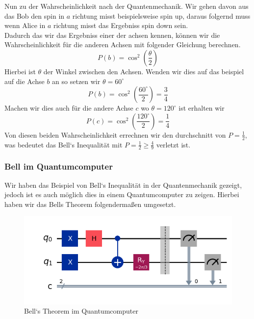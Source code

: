 Nun zu der Wahrscheinlichkeit nach der Quantenmechanik. Wir gehen davon aus das Bob den spin in $a$ richtung misst beispielsweise spin up, daraus folgernd muss wenn Alice in $a$ richtung misst das Ergebniss spin down sein.\\
Dadurch das wir das Ergebniss einer der achsen kennen, können wir die Wahrscheinlichkeit für die anderen Achsen mit folgender Gleichung berechnen.
\begin{equation}
    P(b) = \cos^2(\frac{\theta}{2})
\end{equation}
Hierbei ist $\theta$ der Winkel zwischen den Achsen. Wenden wir dies auf das beispiel auf die Achse $b$ an so setzen wir $\theta = 60^\circ$
\begin{equation}
    P(b) = \cos^2(\frac{60^\circ}{2}) = \frac{3}{4}
\end{equation}
Machen wir dies auch für die andere Achse $c$ wo $\theta = 120^\circ$ ist erhalten wir
\begin{equation}
    P(c) = \cos^2(\frac{120^\circ}{2}) = \frac{1}{4}
\end{equation}
Von diesen beiden Wahrscheinlichkeit errechnen wir den durchschnitt von $P = \frac{1}{2}$, was bedeutet das Bell`s Inequalität mit $P = \frac{1}{2} \ge \frac{4}{9}$ verletzt ist.\\

\subsubsection{Bell im Quantumcomputer}
\label{subsubsec:bell_quantumcomputer}
Wir haben das Beispiel von Bell`s Inequalität in der Quantenmechanik gezeigt, jedoch ist es auch möglich dies in einem Quantumcomputer zu zeigen.
Hierbei haben wir das Bells Theorem folgendermaßen umgesetzt.
\begin{figure}[H]
    \centering
    \includegraphics[width=0.9\linewidth]{img/BellCircuit.png}
    \caption{Bell`s Theorem im Quantumcomputer}
    \label{fig:BellCircuit}
\end{figure}

